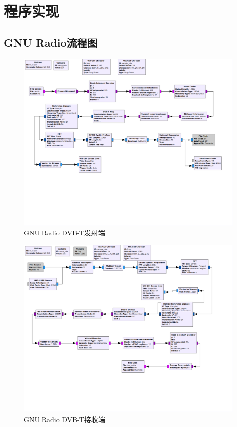 \chapter{程序实现}
\section{GNU Radio流程图}
\par 
\begin{figure}[htb]
	\centering
	\includegraphics[width=13cm]{figures/dvbt_tx.png}
	\caption{GNU Radio DVB-T发射端}
	\label{fig:gnuradio_dvbt_tx}
\end{figure}
\begin{figure}[htb]
	\centering
	\includegraphics[width=13cm]{figures/dvbt_rx.png}
	\caption{GNU Radio DVB-T接收端}
	\label{fig:gnuradio_dvbt_rx}
\end{figure}
